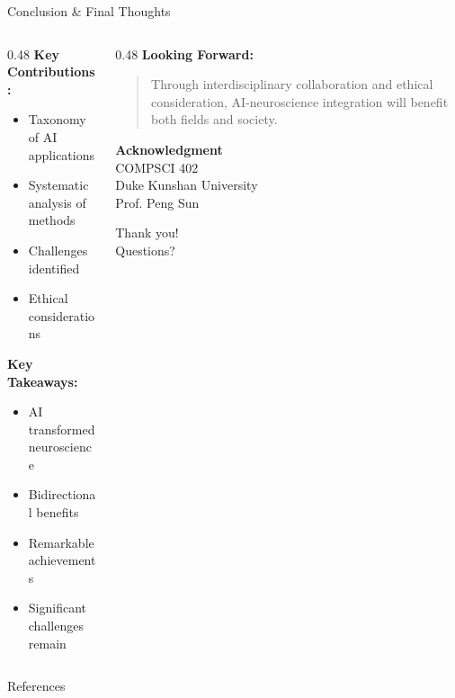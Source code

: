\documentclass[aspectratio=169]{beamer}
\begin{document}
\begin{frame}{Conclusion \& Final Thoughts}
  \begin{columns}[T]
    \begin{column}{0.48\textwidth}
      \textbf{Key Contributions:}
      \begin{itemize}
        \item Taxonomy of AI applications
        \item Systematic analysis of methods
        \item Challenges identified
        \item Ethical considerations
      \end{itemize}
      
      \vspace{0.5em}
      
      \textbf{Key Takeaways:}
      \begin{itemize}
        \item AI transformed neuroscience
        \item Bidirectional benefits
        \item Remarkable achievements
        \item Significant challenges remain
      \end{itemize}
    \end{column}
    
    \begin{column}{0.48\textwidth}
      \textbf{Looking Forward:}
      \begin{quote}
        \small Through interdisciplinary collaboration and ethical consideration, AI-neuroscience integration will benefit both fields and society.
      \end{quote}
      
      \vspace{1em}
      
      \textbf{Acknowledgment}\\
      {\small COMPSCI 402\\Duke Kunshan University\\Prof. Peng Sun}
      
      \vspace{1em}
      
      \begin{center}
        {\Large Thank you!}\\
        {\small Questions?}
      \end{center}
    \end{column}
  \end{columns}
\end{frame}

\begin{frame}[allowframebreaks]{References}
  \tiny
  \printbibliography[heading=none]
\end{frame}
\end{document}
